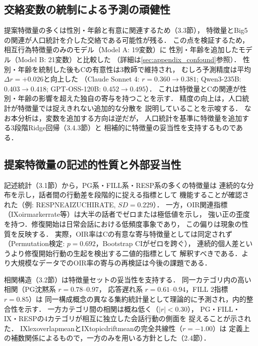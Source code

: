 \documentclass[dvipdfmx,11pt,a4paper]{bxjsarticle}
\renewcommand{\_}{\paperorigunderscore\allowbreak}%
\begin{document}
\subsection{交絡変数の統制による予測の頑健性}


提案特徴量の多くは性別・年齢と有意に関連するため（3.3節），
特徴量とBig5の関連が人口統計を介した交絡である可能性が残る．
この点を検証するため，相互行為特徴量のみのモデル（Model A: 19変数）に
性別・年齢を追加したモデル（Model B: 21変数）と比較した
（詳細は\ref{sec:appendix_confound}参照）．
性別・年齢を統制した後もCの有意性は3教師で維持され，
むしろ予測精度は平均$\Delta r = +0.026$と向上した
（Claude Sonnet 4: $r = 0.360 \to 0.381$;
Qwen3-235B: $0.403 \to 0.418$;
GPT-OSS-120B: $0.452 \to 0.495$）．
これは特徴量とCの関連が性別・年齢の影響を超えた独自の寄与を持つことを示す．
精度の向上は，人口統計が特徴量では捉えきれない追加的な分散を
説明していることを示唆する．
なお本分析は，変数を追加する方向は逆だが，
人口統計を基準に特徴量を追加する3段階Ridge回帰（3.4.3節）と
相補的に特徴量の妥当性を支持するものである．

\subsection{提案特徴量の記述的性質と外部妥当性}

記述統計（3.1節）から，PG系・FILL系・RESP系の多くの特徴量は
連続的な分布を示し，話者間の行動差を段階的に捉える指標として
機能することが確認された（例: RESP\_NE\_AIZUCHI\_RATE, $SD = 0.229$）．
一方，OIR関連指標（IX\_oirmarker\_rate等）は大半の話者でゼロまたは極低値を示し，
強い正の歪度を持つ．修復開始は日常会話における低頻度事象であり，
この偏りは現象の性質を反映する．
実際，OIR率はCの有意な寄与特徴量としては同定されず
（Permutation検定: $p = 0.692$，Bootstrap CIがゼロを跨ぐ），
連続的個人差というより修復開始行動の生起を検出する二値的指標として
解釈すべきである．より大規模なデータでのOIR率の寄与の再検証は今後の課題である．

相関構造（3.2節）は特徴量セットの妥当性を支持する．
同一カテゴリ内の高い相関（PG沈黙系 $r = 0.78$--$0.97$，
応答遅れ系 $r = 0.61$--$0.94$，FILL 2指標 $r = 0.85$）は
同一構成概念の異なる集約統計量として理論的に予測され，内的整合性を示す．
一方カテゴリ間の相関は概ね低く（$|r| < 0.30$），
PG・FILL・IX・RESPの4カテゴリが相互に独立した会話行動の側面を
捉えることが示された．
IX\_lex\_overlap\_meanとIX\_topic\_drift\_meanの完全共線性（$r = -1.00$）は
定義上の補数関係によるもので，一方のみを用いる方針とした（2.4節）．
\end{document}
